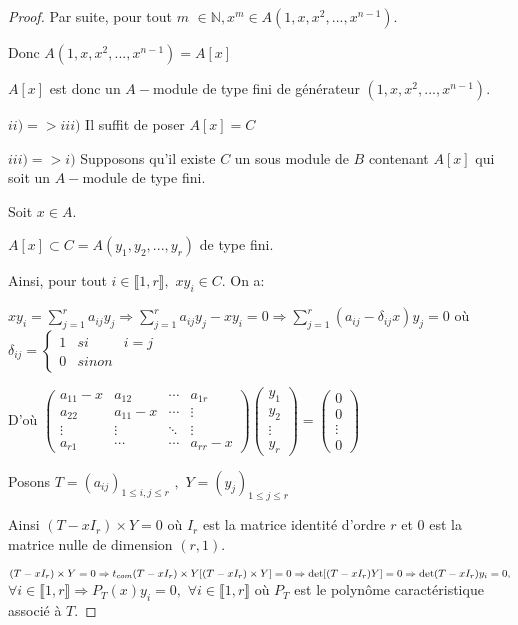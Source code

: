\begin{proof}
	Par suite, pour tout $m$ $\in \mathbb{N},x^{m}\in A(1,x,x^{2},...,x^{n-1}).$
	
	Donc $A(1,x,x^{2},...,x^{n-1})=A[x]$
	
	$A[x]$ est donc un $A-$module de type fini de générateur $%
	(1,x,x^{2},...,x^{n-1}).$
	
	$ii)=>iii)$ Il suffit de poser $A[x]=C$
	
	$iii)=>i)$ Supposons qu'il existe $C$ un sous module de $B$ contenant $A[x]$
	qui soit un $A-$module de type fini.
	
	Soit $x\in A.$
	
	$A[x]\subset C=A(y_{1},y_{2},...,y_{r})$ de type fini.
	
	Ainsi, pour tout $i\in \llbracket 1, r \rrbracket ,$ $xy_{i}\in C.$ On
	a:
	
	$xy_{i}=\sum\limits_{j=1}^{r}a_{ij}y_{j}\Rightarrow
	\sum\limits_{j=1}^{r}a_{ij}y_{j}-xy_{i}=0\Rightarrow
	\sum\limits_{j=1}^{r}(a_{ij}-\delta _{ij}x)y_{j}=0$ où $\delta_{ij}=\left\{ 
	\begin{array}{ccc}
		1 & { si } & i=j \\ 
		0 & { sinon}
	\end{array}
	\right. $
	
	D'où $\left( 
	\begin{array}{cccc}
		a_{11}-x & a_{12} & \cdots & a_{1r} \\ 
		a_{22} & a_{11}-x & \cdots& \vdots\\ 
		\vdots & \vdots& \ddots  & \vdots\\ 
		a_{r1} & \cdots & \cdots & a_{rr}-x
	\end{array}%
	\right) \left( 
	\begin{array}{c}
		y_{1} \\ 
		y_{2} \\ 
		\vdots \\ 
		y_{r}%
	\end{array}%
	\right) =\left( 
	\begin{array}{c}
		0 \\ 
		0 \\ 
		\vdots\\ 
		0%
	\end{array}%
	\right) $
	
	Posons $T=(a_{ij})_{1\leq i,j\leq r}$ $,$ $Y=(y_{j})_{1\leq j\leq r}$ 
	
	Ainsi $(T-xI_{r})\times Y=0$ où $I_{r}$ est la matrice identité
	d'ordre $r$ et $0$ est la matrice nulle de dimension $(r,1).$
	
	$(T-xI_{r})\times Y=0\Rightarrow {t_{com}}(T-xI_{r})\times
	Y[(T-xI_{r})\times Y]=0\\
	\Rightarrow \det [(T-xI_{r})Y]=0
	\Rightarrow \det(T-xI_{r})y_{i}=0,$ $\forall i\in \llbracket 1, r \rrbracket $$\Rightarrow P_{T}(x)y_{i}=0,$ $\forall i\in \llbracket 1, r \rrbracket
	$ où $P_{T}$ est le polynôme caractéristique associé à $T.$
	

\end{proof}
